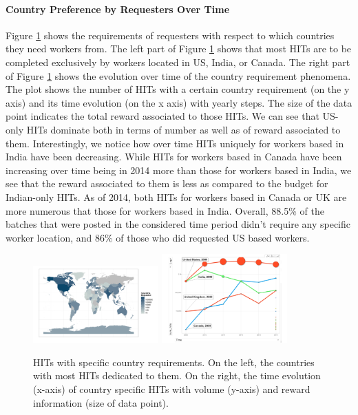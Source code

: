 \paragraph{Country Preference by Requesters Over Time}
Figure \ref{fig:country} shows the requirements of requesters with respect to which countries they need workers from. The left part of Figure \ref{fig:country} shows that most HITs are to be completed exclusively by workers located in US, India, or Canada. The right part of Figure \ref{fig:country} shows the evolution over time of the country requirement phenomena.
The plot shows the number of HITs with a certain country requirement (on the y axis) and its time evolution (on the x axis) with yearly steps. The size of the data point indicates the total reward associated to those HITs.
We can see that US-only HITs dominate both in terms of number as well as of reward associated to them. 
Interestingly, we notice how over time HITs uniquely for workers based in India have been decreasing. 
While HITs for workers based in Canada have been increasing over time being in 2014 more than those for workers based in India, we see that the reward associated to them is less as compared to the budget for Indian-only HITs.
As of 2014, both HITs for workers based in Canada or UK are more numerous that those for workers based in India.
Overall, 88.5\% of the batches that were posted in the considered time period didn't require any specific worker location, and 86\% of those who did requested US based workers.
\begin{figure}[htbp]
	\centering
		\includegraphics[width=0.43\textwidth]{figures/map}
		\includegraphics[width=0.43\textwidth]{figures/countriesTime}
	\caption{HITs with specific country requirements. On the left, the countries with most HITs dedicated to them. On the right, the time evolution (x-axis) of country specific HITs with volume (y-axis) and reward information (size of data point).}
	\label{fig:country}
\end{figure}

